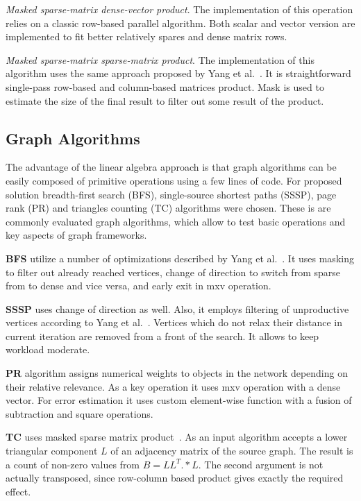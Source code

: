 \textit{Masked sparse-matrix dense-vector product}. The implementation of this operation relies on a classic row-based parallel algorithm. Both scalar and vector version are implemented to fit better relatively spares and dense matrix rows. 

\textit{Masked sparse-matrix sparse-matrix product}. The implementation of this algorithm uses the same approach proposed by Yang et al.~\cite{yang2019graphblast}. It is straightforward single-pass row-based and column-based matrices product. Mask is used to estimate the size of the final result to filter out some result of the product. 

\subsection{Graph Algorithms}

The advantage of the linear algebra approach is that graph algorithms can be easily composed of primitive operations using a few lines of code. For proposed solution breadth-first search (BFS), single-source shortest paths (SSSP), page rank (PR) and triangles counting (TC) algorithms were chosen. These is are commonly evaluated graph algorithms, which allow to test basic operations and key aspects of graph frameworks.

\textbf{BFS} utilize a number of optimizations described by Yang et al.~\cite{https://doi.org/10.48550/arxiv.1804.03327:pushpull}. It uses masking to filter out already reached vertices, change of direction to switch from sparse from to dense and vice versa, and early exit in mxv operation.

\textbf{SSSP} uses change of direction as well. Also, it employs filtering of unproductive vertices according to Yang et al.~\cite{yang2019graphblast}. Vertices which do not relax their distance in current iteration are removed from a front of the search. It allows to keep workload moderate. 

\textbf{PR} algorithm assigns numerical weights to objects in the network depending on their relative relevance. As a key operation it uses mxv operation with a dense vector. For error estimation it uses custom element-wise function with a fusion of subtraction and square operations.  

\textbf{TC} uses masked sparse matrix product~\cite{yang2019graphblast}. As an input algorithm accepts a lower triangular component $L$ of an adjacency matrix of the source graph. The result is a count of non-zero values from $B = LL^T .* L$. The second argument is not actually transposed, since row-column based product gives exactly the required effect.